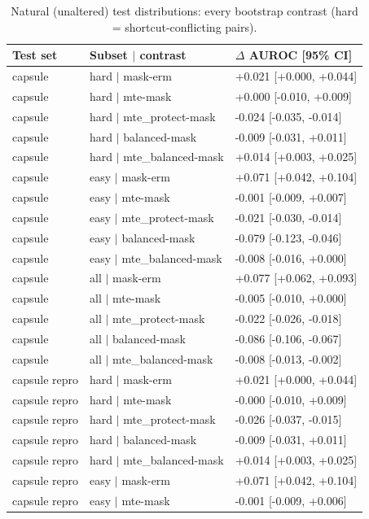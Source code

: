\begin{table}[H]\centering\scriptsize
\caption{Natural (unaltered) test distributions: every bootstrap contrast (hard = shortcut-conflicting pairs).}\label{tab:natural}
\begin{tabular}{lll}\toprule
Test set & Subset $|$ contrast & $\Delta$ AUROC [95\% CI] \\\midrule
capsule & hard $|$ mask-erm & +0.021 [+0.000, +0.044] \\
capsule & hard $|$ mte-mask & +0.000 [-0.010, +0.009] \\
capsule & hard $|$ mte\_protect-mask & -0.024 [-0.035, -0.014] \\
capsule & hard $|$ balanced-mask & -0.009 [-0.031, +0.011] \\
capsule & hard $|$ mte\_balanced-mask & +0.014 [+0.003, +0.025] \\
capsule & easy $|$ mask-erm & +0.071 [+0.042, +0.104] \\
capsule & easy $|$ mte-mask & -0.001 [-0.009, +0.007] \\
capsule & easy $|$ mte\_protect-mask & -0.021 [-0.030, -0.014] \\
capsule & easy $|$ balanced-mask & -0.079 [-0.123, -0.046] \\
capsule & easy $|$ mte\_balanced-mask & -0.008 [-0.016, +0.000] \\
capsule & all $|$ mask-erm & +0.077 [+0.062, +0.093] \\
capsule & all $|$ mte-mask & -0.005 [-0.010, +0.000] \\
capsule & all $|$ mte\_protect-mask & -0.022 [-0.026, -0.018] \\
capsule & all $|$ balanced-mask & -0.086 [-0.106, -0.067] \\
capsule & all $|$ mte\_balanced-mask & -0.008 [-0.013, -0.002] \\
capsule repro & hard $|$ mask-erm & +0.021 [+0.000, +0.044] \\
capsule repro & hard $|$ mte-mask & -0.000 [-0.010, +0.009] \\
capsule repro & hard $|$ mte\_protect-mask & -0.026 [-0.037, -0.015] \\
capsule repro & hard $|$ balanced-mask & -0.009 [-0.031, +0.011] \\
capsule repro & hard $|$ mte\_balanced-mask & +0.014 [+0.003, +0.025] \\
capsule repro & easy $|$ mask-erm & +0.071 [+0.042, +0.104] \\
capsule repro & easy $|$ mte-mask & -0.001 [-0.009, +0.006] \\

\end{tabular}
\end{table}
